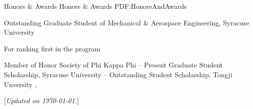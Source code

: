 \documentclass[letterpaper,MMMyyyy,nonstopmode]{simpleresumecv}
\newcommand{\CVNote}{Updated on {\today}.}
\begin{document}
\begin{Body}

\Section
{Honors \& Awards}
{Honors \& Awards}
{PDF:HonorsAndAwards}

    \BulletItem
    Outstanding Graduate Student of Mechanical \& Aerospace Engineering, Syracuse University
    \hfill
        \begin{Detail}
        \Item
        For ranking first in the program
        \end{Detail}
    \Gap
    \BulletItem
    Member of Honor Society of Phi Kappa Phi
    \hfill
     -- Present
    \Gap
    \BulletItem
    Graduate Student Scholarship, Syracuse University
    \hfill
     -- 
    \Gap
    \BulletItem
    Outstanding Student Scholarship, Tongji Unversity
    \hfill
    , 
    \Gap

\end{Body}


\BigGap
\UseNoteFont%
\null\hfill%
[\textit{\CVNote}]
\end{document}
